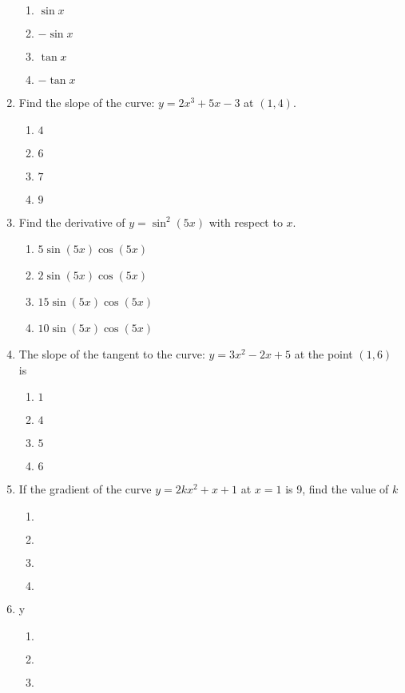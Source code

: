\begin{multicols}{2}
\begin{enumerate}[label={\arabic*.}]
	\begin{enumerate}[label={\Alph*.}]
	\item \(\sin{x}\)
	\item \(-\sin{x}\)
	\item \(\tan{x}\)
	\item \(-\tan{x}\)
	\end{enumerate}
\item Find the slope of the curve: \(y = 2x^{3}+ 5{x}-3\) at \((1,4)\).
	\begin{enumerate}[label={\Alph*.}]
	\item \(4\)
	\item \(6\)
	\item \(7\)
	\item \(9\)
	\end{enumerate}
\item Find the derivative of \(y = \sin^{2}{(5x)}\) with respect to \(x\).
	\begin{enumerate}[label={\Alph*.}]
	\item \(5 \sin{(5x)\cos{(5x)}}\)
	\item \(2 \sin{(5x)\cos{(5x)}}\)
	\item \(15 \sin{(5x)\cos{(5x)}}\)
	\item \(10 \sin{(5x)\cos{(5x)}}\)
	\end{enumerate}
\item The slope of the tangent to the curve: \(y=3{x}^{2}-2x+5\) at the point \((1,6)\) is
	\begin{enumerate}[label={\Alph*.}]
	\item \(1\)
	\item \(4\)
	\item \(5\)
	\item \(6\)
	\end{enumerate}
\item If the gradient of the curve \(y=2k{x}^{2}+x+1\) at \(x = 1\) is 9, find the value of \(k\)
	\begin{enumerate}[label={\Alph*.}]
	\item \(\)
	\item \(\)
	\item \(\)
	\item \(\)
	\end{enumerate}
\item y
	\begin{enumerate}[label={\Alph*.}]
	\item \(\)
	\item \(\)
	\item \(\)

\end{enumerate}
\end{enumerate}
\end{multicols}
